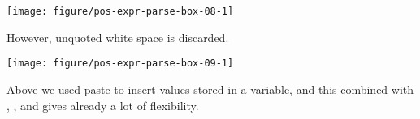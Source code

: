 \documentclass[krantz2]{krantz}\usepackage{knitr}%
\begin{document}
\begin{explainbox}
\begin{knitrout}
{}



\end{knitrout}

\begin{knitrout}\footnotesize
{}\color{fgcolor}\begin{kframe}
\begin{alltt}
  \hlopt{+}
  \hlstd{()} \hlopt{+}
  \hlstd{(}\hlstd{(} \hlstd{=} \hlstd{))}
\end{alltt}
\end{kframe}

{\centering \texttt{[image: figure/pos-expr-parse-box-08-1]} 

}



\end{knitrout}

However, unquoted white space is discarded.

\begin{knitrout}\footnotesize
{}\color{fgcolor}\begin{kframe}
\begin{alltt}
  \hlopt{+}
  \hlstd{()} \hlopt{+}
  \hlstd{(}\hlstd{(} \hlstd{=} \hlstd{))}
\end{alltt}
\end{kframe}

{\centering \texttt{[image: figure/pos-expr-parse-box-09-1]} 

}



\end{knitrout}

\end{explainbox}

Above we used paste to insert values stored in a variable, and this combined with , , and  gives already a lot of flexibility.
\end{document}
